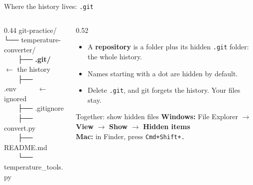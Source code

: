 \documentclass[aspectratio=169,11pt]{beamer}
\newcommand{\code}[1]{\texttt{#1}}
\newcommand{\key}[1]{\textbf{\textcolor{ban}{#1}}}
\newcommand{\ui}[1]{\textbf{#1}}
\begin{document}
\begin{frame}{Where the history lives: \code{.git}}
  \begin{columns}[T]
    \begin{column}{0.44\textwidth}
      \ttfamily\small
      \textcolor{softgray}{git-practice/}\\
      └── temperature-converter/\\
      \ \ \ \ ├── \textbf{.git/}\ \ \textcolor{ban}{$\leftarrow$ the history}\\
      \ \ \ \ ├── .env\ \ \ \ \ \ \textcolor{ban}{$\leftarrow$ ignored}\\
      \ \ \ \ ├── .gitignore\\
      \ \ \ \ ├── convert.py\\
      \ \ \ \ ├── README.md\\
      \ \ \ \ └── temperature\_tools.py
    \end{column}
    \begin{column}{0.52\textwidth}
      \begin{itemize}
        \item A \key{repository} is a folder plus its hidden \code{.git} folder: the whole history.
        \item Names starting with a dot are hidden by default.
        \item Delete \code{.git}, and git forgets the history. Your files stay.
      \end{itemize}
      \vspace{0.2em}
      \begin{block}{Together: show hidden files}
        \textbf{Windows:} File Explorer $\rightarrow$ \ui{View} $\rightarrow$ \ui{Show} $\rightarrow$ \ui{Hidden items}\\
        \textbf{Mac:} in Finder, press \code{Cmd+Shift+.}
      \end{block}
    \end{column}
  \end{columns}
\end{frame}
\end{document}

